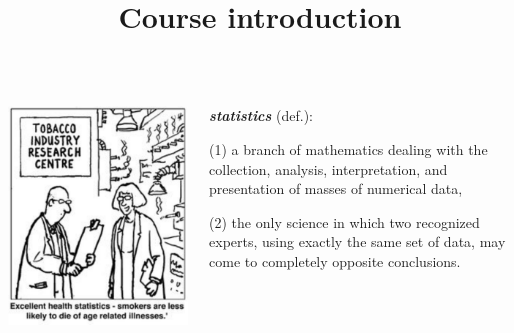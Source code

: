 

\title[Course introduction]{Course introduction}



\begin{frame}

\begin{columns}[c]
\column{2in}

\includegraphics[width=0.90\linewidth]{../LectureAssets/L00/Lecture00cartoon}

\column{2in}
\begin{small}

\noindent \emph{\textbf{statistics}} (def.): 

\bigskip

(1) a branch of mathematics dealing with the collection, analysis, interpretation, and presentation of masses of numerical data,

\smallskip

(2)  the only science in which two recognized experts, using exactly the same set of data, may come to completely opposite conclusions.
\end{small}

\end{columns}

\bigskip

\end{frame}

